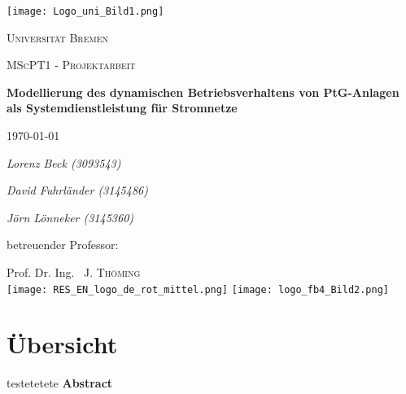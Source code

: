 \documentclass[onecolumn,10pt,titlepage]{article}
\begin{document}
\begin{titlepage}
	\centering

	{\texttt{[image: Logo\_uni\_Bild1.png]}\par}
	\vspace{1cm}
	{\scshape\Large Universität Bremen \par}
	\vspace{1cm}
	{\scshape\LARGE MScPT1 - Projektarbeit \par}
	\vspace{1.5cm}
	{\huge\bfseries Modellierung des dynamischen Betriebsverhaltens von PtG-Anlagen als Systemdienstleistung für Stromnetze\par}
	\vspace{2cm}
    {\large \today\par}
    \vspace{2cm}
	{\Large\itshape Lorenz Beck (3093543)\par}
    \vspace{0.3cm}
    {\Large\itshape David Fuhrländer (3145486)\par}
    \vspace{0.3cm}
    {\Large\itshape Jörn Lönneker (3145360)\par}
	\vfill
	betreuender Professor:\par
	Prof. Dr. Ing. ~J. \textsc{Thöming}\\

    \vfill
   	\texttt{[image: RES\_EN\_logo\_de\_rot\_mittel.png]}
	\hfill
	\texttt{[image: logo\_fb4\_Bild2.png]}%


\end{titlepage}

\onehalfspace

\section*{Übersicht}
testetetete
{\textbf{Abstract}}\par
\end{document}
